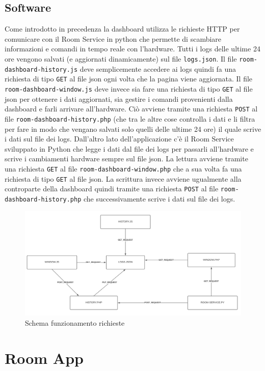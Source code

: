 \documentclass[12pt]{article}
\def\code#1{\texttt{#1}}
\begin{document}
\subsection{Software}
Come introdotto in precedenza la dashboard utilizza le richieste HTTP per comunicare con il Room Service in python che permette di scambiare informazioni e comandi in tempo reale con l'hardware. \newline
Tutti i logs delle ultime 24 ore vengono salvati (e aggiornati dinamicamente) sul file \code{logs.json}. \newline
Il file \code{room-dashboard-history.js} deve semplicemente accedere ai logs quindi fa una richiesta di tipo \code{GET} al file json ogni volta che la pagina viene aggiornata. \newline
Il file \code{room-dashboard-window.js} deve invece sia fare una richiesta di tipo \code{GET} al file json per ottenere i dati aggiornati, sia gestire i comandi provenienti dalla dashboard e farli arrivare all'hardware. Ciò avviene tramite una richiesta \code{POST} al file \code{room-dashboard-history.php} (che tra le altre cose controlla i dati e li filtra per fare in modo che vengano salvati solo quelli delle ultime 24 ore) il quale scrive i dati sul file dei logs. \newline
Dall'altro lato dell'applicazione c'è il Room Service sviluppato in Python che legge i dati dal file dei logs per passarli all'hardware e scrive i cambiamenti hardware sempre sul file json. La lettura avviene tramite una richiesta \code{GET} al file \code{room-dashboard-window.php} che a sua volta fa una richiesta di tipo \code{GET} al file json. La scrittura invece avviene ugualmente alla controparte della dashboard quindi tramite una richiesta \code{POST} al file \code{room-dashboard-history.php} che successivamente scrive i dati sul file dei logs.
\begin{figure}[H]
    \includegraphics[width=17cm]{dashboard-requests-schema.png}
    \centering
    \caption{Schema funzionamento richieste}
    \centering
\end{figure}

\newpage

\section{Room App}
\end{document}
